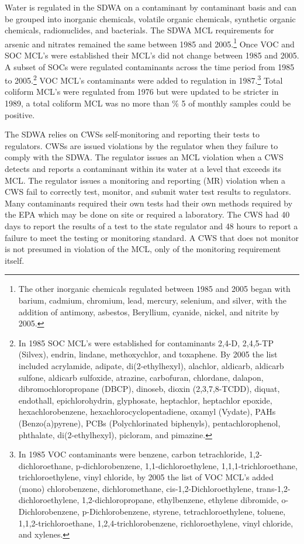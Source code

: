 \documentclass{article}
\begin{document}
Water is regulated in the SDWA on a contaminant by contaminant basis and can be grouped into inorganic chemicals, volatile organic chemicals, synthetic organic chemicals, radionuclides, and bacterials. The SDWA MCL requirements for arsenic and nitrates remained the same between 1985 and 2005.\footnote{The other inorganic chemicals regulated between 1985 and 2005 began with barium, cadmium, chromium, lead, mercury, selenium, and silver, with the addition of antimony, asbestos, Beryllium, cyanide, nickel, and nitrite by 2005.} Once VOC and SOC MCL's were established their MCL's did not change between 1985 and 2005. A subset of SOCs were regulated contaminants across the time period from 1985 to 2005.\footnote{In 1985 SOC MCL's were established for contaminants 2,4-D, 2,4,5-TP (Silvex), endrin, lindane, methoxychlor, and toxaphene. By 2005 the list included acrylamide, adipate, di(2-ethylhexyl), alachlor, aldicarb, aldicarb sulfone, aldicarb sulfoxide, atrazine, carbofuran, chlordane, dalapon, dibromochloropropane (DBCP), dinoseb, dioxin (2,3,7,8-TCDD), diquat, endothall, epichlorohydrin, glyphosate, heptachlor, heptachlor epoxide, hexachlorobenzene, hexachlorocyclopentadiene, oxamyl (Vydate), PAHs (Benzo(a)pyrene), PCBs (Polychlorinated biphenyls), pentachlorophenol, phthalate, di(2-ethylhexyl), picloram, and pimazine.} VOC MCL's contaminants were added to regulation in 1987.\footnote{In 1985 VOC contaminants were benzene, carbon tetrachloride, 1,2-dichloroethane, p-dichlorobenzene, 1,1-dichloroethylene, 1,1,1-trichloroethane, trichloroethylene, vinyl chloride, by 2005 the list of VOC MCL's added (mono) chlorobenzene, dichloromethane, cis-1,2-Dichloroethylene, trans-1,2-dichloroethylene, 1,2-dichloropropane, ethylbenzene, ethylene dibromide, o-Dichlorobenzene, p-Dichlorobenzene, styrene, tetrachloroethylene, toluene, 1,1,2-trichloroethane, 1,2,4-trichlorobenzene, richloroethylene, vinyl chloride, and xylenes.} Total coliform MCL's were regulated from 1976 but were updated to be stricter in 1989, a total coliform MCL was no more than \% 5 of monthly samples could be positive.

The SDWA relies on CWSs self-monitoring and reporting their tests to regulators. CWSs are issued violations by the regulator when they failure to comply with the SDWA. The regulator issues an MCL violation when a CWS detects and reports a contaminant within its water at a level that exceeds its MCL. The regulator issues a monitoring and reporting (MR) violation when a CWS fail to correctly test, monitor, and submit water test results to regulators. Many contaminants required their own tests had their own methods required by the EPA which may be done on site or required a laboratory. The CWS had 40 days to report the results of a test to the state regulator and 48 hours to report a failure to meet the testing or monitoring standard. A CWS that does not monitor is not presumed in violation of the MCL, only of the monitoring requirement itself.
\end{document}
